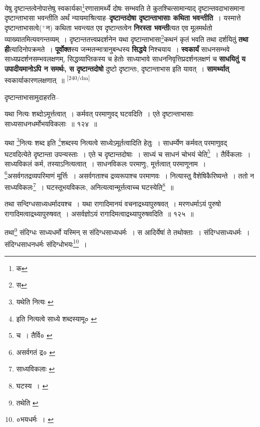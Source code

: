 \documentclass[article,12pt,a4paper]{memoir}
\newcommand{\add}[1]{($^{+}$#1)}
\begin{document}
	  \pstart येषु दृष्टान्तत्वेनोपात्तेषु स्वकार्यका\footnote{क}रणासामर्थ्ये दोषः सम्भवति ते कुतश्चित्सामान्याद् दृष्टान्तवदाभासमाना दृष्टान्ताभासा भवन्तीति अर्थं न्यायमाश्रित्याह--\textbf{दृष्टान्तदोषा दृष्टान्ताभासाः कथिता भवन्तीति} । यस्मात्ते दृष्टान्ताभासत्वे\add{न} कथिता भवन्त्यत एव दृष्टान्तत्वेन \textbf{निरस्ता भवन्ती}त्यत एव मूलमर्थतो व्याख्यातमित्यवगन्तव्यम् । दृष्टान्ततत्त्वप्रदर्शनेन यथा दृष्टान्ताभासा\footnote{स}कथनं कृतं भवति तथा दर्शयितुं \textbf{तथा ही}त्यादिनोपक्रमते । \textbf{पूर्वोक्त}स्य जन्मतन्मात्रानुबन्धस्य \textbf{सिद्धये} निश्चयाय । \textbf{स्वकार्यं} साधनसम्भवे साध्यप्रदर्शनसम्भवलक्षणम्, सिद्धव्याप्तिकस्य च हेतोः साध्याभावे साधननिवृत्तिप्रदर्शनलक्षणं च \textbf{साधयितुं य उपादीयमानोऽपि न समर्थः, स दृष्टान्तदोषो} दुष्टो दृष्टान्तः, दृष्टान्ताभास इति यावत् । \textbf{सामर्थ्यात्} स्वकार्याकारणलक्षणात् ॥
	\pend
      \leavevmode\textsuperscript{\rmlatinfont\tiny [240/dm]}

	  \pstart दृष्टान्ताभासामुदाहरति--
	\pend
       

	  \pstart यथा नित्यः शब्दोऽमूर्त्तत्वात् । कर्मवत् परमाणुवद् घटवदिति । एते दृष्टान्ताभासाः साध्यसाधनधर्मोभयविकलाः ॥ १२४ ॥
	\pend
       

	  \pstart यथा \footnote{यथेति नित्यः \cite{dp-msA} \cite{dp-msB} \cite{dp-edP} \cite{dp-edH} \cite{dp-edE} \cite{dp-edN}}नित्यः शब्द इति \footnote{इति नित्यत्वे साध्ये शब्दस्यामू० \cite{dp-msD} \cite{dp-msB}}शब्दस्य नित्यत्वे साध्येऽमूर्तत्वादिति हेतुः । साधर्म्येण कर्मवत् परमाणुवद् घटवदित्येते दृष्टान्ता उपन्यस्ताः । एते च दृष्टान्तदोषाः । साध्यं च साधनं चोभयं चेति\footnote{च । तैर्वि० \cite{dp-msC}} । तैर्विकलाः । साध्यविकलं कर्म, तस्याऽनित्यत्वात् । साधनविकलः परमाणुः, मूर्त्तत्वात् परमाणूनाम । \footnote{असर्वगतं द्र० \cite{dp-msA} \cite{dp-msB} \cite{dp-edP} \cite{dp-edH} \cite{dp-edN}}असर्वगतद्रव्यपरिमाणं मूर्त्तिः । असर्वगताश्च द्रव्यरूपाश्च परमाणवः । नित्यास्तु वैशेषिकैरिष्यन्ते । ततो न साध्यविकलः\footnote{साध्यविकलाः \cite{dp-msC} \cite{dp-msD}} । घटस्तूभयविकलः, अनित्यत्वान्मूर्त्तत्वाच्च घटस्येति\footnote{घटस्य । \cite{dp-edE}} ॥
	\pend
       

	  \pstart तथा सन्दिग्धसाध्यधर्मादयश्च । यथा रागादिमानयं वचनाद्रथ्यापुरुषवत् । मरणधर्माऽयं पुरुषो रागादिमत्वाद्रथ्यापुरुषवत् । असर्वज्ञोऽयं रागादिमत्वाद्रथ्यापुरुषवदिति ॥ १२५ ॥
	\pend
       

	  \pstart तथा\footnote{तथेति \cite{dp-edE}} संदिग्धः साध्यधर्मो यस्मिन् स संदिग्धसाध्यधर्मः । स आदिर्येषां ते तथोक्ताः । संदिग्धसाध्यधर्मः । संदिग्धसाधनधर्मः संदिग्धोभयः\footnote{०भयधर्मः । \cite{dp-msC}} ।
	\pend
      
\end{document}
